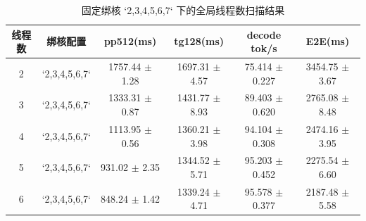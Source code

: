 \begin{table}[ht]
  \centering
  \caption{固定绑核 `2,3,4,5,6,7` 下的全局线程数扫描结果}
  \label{tab:ws-thread-sweep-global}
  \begin{tabular}{c c c c c c}
    \hline
    线程数 & 绑核配置 & pp512(ms) & tg128(ms) & decode tok/s & E2E(ms) \\
    \hline
    2 & `2,3,4,5,6,7` & 1757.44 $\pm$ 1.28 & 1697.31 $\pm$ 4.57 & 75.414 $\pm$ 0.227 & 3454.75 $\pm$ 3.67 \\
    3 & `2,3,4,5,6,7` & 1333.31 $\pm$ 0.87 & 1431.77 $\pm$ 8.93 & 89.403 $\pm$ 0.620 & 2765.08 $\pm$ 8.48 \\
    4 & `2,3,4,5,6,7` & 1113.95 $\pm$ 0.56 & 1360.21 $\pm$ 3.98 & 94.104 $\pm$ 0.308 & 2474.16 $\pm$ 3.95 \\
    5 & `2,3,4,5,6,7` & 931.02 $\pm$ 2.35 & 1344.52 $\pm$ 5.71 & 95.203 $\pm$ 0.452 & 2275.54 $\pm$ 6.60 \\
    6 & `2,3,4,5,6,7` & 848.24 $\pm$ 1.42 & 1339.24 $\pm$ 4.71 & 95.578 $\pm$ 0.377 & 2187.48 $\pm$ 5.58 \\
    \hline
  \end{tabular}
\end{table}
